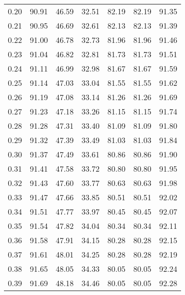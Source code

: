 \begin{tabular}{|c|c|c|c|c|c|c|}
      0.20 &     90.91 &     46.59 &      32.51 &   82.19 &      82.19 &         91.35 \\
      0.21 &     90.95 &     46.69 &      32.61 &   82.13 &      82.13 &         91.39 \\
      0.22 &     91.00 &     46.78 &      32.73 &   81.96 &      81.96 &         91.46 \\
      0.23 &     91.04 &     46.82 &      32.81 &   81.73 &      81.73 &         91.51 \\
      0.24 &     91.11 &     46.99 &      32.98 &   81.67 &      81.67 &         91.59 \\
      0.25 &     91.14 &     47.03 &      33.04 &   81.55 &      81.55 &         91.62 \\
      0.26 &     91.19 &     47.08 &      33.14 &   81.26 &      81.26 &         91.69 \\
      0.27 &     91.23 &     47.18 &      33.26 &   81.15 &      81.15 &         91.74 \\
      0.28 &     91.28 &     47.31 &      33.40 &   81.09 &      81.09 &         91.80 \\
      0.29 &     91.32 &     47.39 &      33.49 &   81.03 &      81.03 &         91.84 \\
      0.30 &     91.37 &     47.49 &      33.61 &   80.86 &      80.86 &         91.90 \\
      0.31 &     91.41 &     47.58 &      33.72 &   80.80 &      80.80 &         91.95 \\
      0.32 &     91.43 &     47.60 &      33.77 &   80.63 &      80.63 &         91.98 \\
      0.33 &     91.47 &     47.66 &      33.85 &   80.51 &      80.51 &         92.02 \\
      0.34 &     91.51 &     47.77 &      33.97 &   80.45 &      80.45 &         92.07 \\
      0.35 &     91.54 &     47.82 &      34.04 &   80.34 &      80.34 &         92.11 \\
      0.36 &     91.58 &     47.91 &      34.15 &   80.28 &      80.28 &         92.15 \\
      0.37 &     91.61 &     48.01 &      34.25 &   80.28 &      80.28 &         92.19 \\
      0.38 &     91.65 &     48.05 &      34.33 &   80.05 &      80.05 &         92.24 \\
      0.39 &     91.69 &     48.18 &      34.46 &   80.05 &      80.05 &         92.28 \\

\end{tabular}
